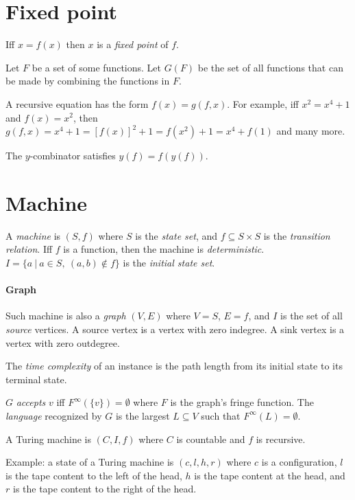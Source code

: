 \section{Fixed point}

Iff \(x = f(x)\) then \(x\) is a \emph{fixed point} of \(f\).

Let \(F\) be a set of some functions.
Let \(G(F)\) be the set of all functions that can be made by combining the functions in \(F\).

A recursive equation has the form \(f(x) = g(f,x)\).
For example, iff \(x^2 = x^4 + 1\) and \(f(x) = x^2\), then \(g(f,x) = x^4 + 1 = [f(x)]^2 + 1 = f(x^2) + 1 = x^4 + f(1)\)
and many more.

The \(y\)-combinator satisfies \(y(f) = f(y(f))\).

\section{Machine}

A \emph{machine} is \((S,f)\)
where \(S\) is the \emph{state set},
and \(f \subseteq S \times S\) is the \emph{transition relation}.
Iff \(f\) is a function, then the machine is \emph{deterministic}.
\(I = \{ a ~|~ a \in S, ~ (a,b) \not\in f \}\) is the \emph{initial state set}.

\paragraph{Graph}
Such machine is also a \emph{graph} \((V,E)\) where \(V=S\), \(E = f\),
and \(I\) is the set of all \emph{source} vertices.
A source vertex is a vertex with zero indegree.
A sink vertex is a vertex with zero outdegree.

The \emph{time complexity} of an instance is the path length from its initial state to its terminal state.

\(G\) \emph{accepts} \(v\) iff \(F^\infty(\{v\}) = \emptyset\) where \(F\) is the graph's fringe function.
The \emph{language} recognized by \(G\) is the largest \(L \subseteq V\) such that \(F^\infty(L) = \emptyset\).

A Turing machine is \((C,I,f)\)
where \(C\) is countable
and \(f\) is recursive.

Example: a state of a Turing machine is \((c,l,h,r)\)
where \(c\) is a configuration,
\(l\) is the tape content to the left of the head,
\(h\) is the tape content at the head,
and \(r\) is the tape content to the right of the head.

